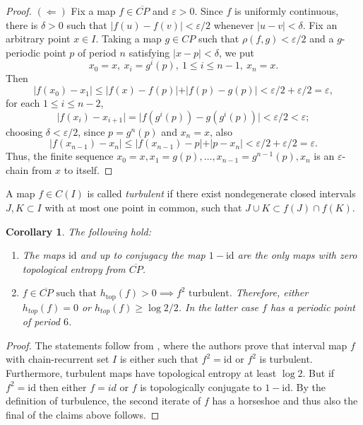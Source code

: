 \documentclass[12pt, a4paper]{amsart}
\newtheorem{corollary}[theorem]{Corollary}
\def\eps{\varepsilon}
\def\le{\leqslant}
\newcommand{\?}{{\bf ???}}
\begin{document}
\begin{proof}
   $(\Leftarrow)$ Fix a map $f\in \overline{CP}$ and $\eps>0$. Since $f$ is uniformly continuous, there is  $\delta>0$ such that $\vert f(u)-f(v)\vert<\eps/2$ whenever $\vert u-v\vert<\delta$. Fix an arbitrary point $x\in I$. Taking a map $g\in CP$ such that $\rho(f,g)<\eps/2$ and a $g$-periodic point $p$ of period $n$ satisfying $\vert x-p\vert<\delta$, we put  
$$x_0=x,~x_i=g^i(p),~ 1\le i\le n-1,~x_n=x.$$ Then 
$$\vert f(x_0)-x_1\vert\le \vert f(x)-f(p)\vert +\vert f(p)-g(p)\vert<\eps/2+\eps/2=\eps,$$
for each $1\le i\le n-2$, 
$$\vert f(x_i)-x_{i+1}\vert=\vert f(g^i(p))-g(g^i(p))\vert<\eps/2<\eps;$$
choosing $\delta<\eps/2$, since $p=g^n(p)$ and $x_n=x$, also 
$$\vert f(x_{n-1})-x_n\vert\le \vert f(x_{n-1})-p\vert +\vert p-x_n\vert<\eps/2+\eps/2=\eps.$$
Thus, the finite sequence $x_0=x,x_1=g(p),\dots,x_{n-1}=g^{n-1}(p),x_n$ is an $\eps$-chain from $x$ to itself.
\end{proof}





A map $f\in C(I)$ is called \textit{turbulent} if there exist nondegenerate closed intervals $J, K \subset I$ with at most one point in common, such that $J\cup K\subset f(J)\cap f(K)$. 

\begin{corollary}\label{cor:turbulence} The following hold:
\begin{enumerate}
\item The maps $\mathrm{id}$ and up to conjugacy the map $1-\mathrm{id}$  are the only maps with zero topological entropy from $\overline{CP}$.
\item
$f\in \overline{CP} \text{ such that } h_{\mathrm{top}}(f)>0 \implies f^2 \text{ turbulent.}$ Therefore, either $h_{top}(f)=0$ or $h_{top}(f)\geq\log{2}/2$. In the latter case $f$ has a periodic point of period $6$.
\end{enumerate}
\end{corollary}

\begin{proof}
 The statements follow from \cite{BC}, where the authors prove that interval map $f$ with chain-recurrent set $I$ is either such that $f^2=\mathrm{id}$  or $f^2$ is turbulent. Furthermore,  turbulent maps have  topological entropy at least   $\log 2$. But if $f^2=\mathrm{id}$ then either $f=id$ or   $f$ is topologically conjugate to $1-\mathrm{id}$. By the definition of turbulence, the second iterate of $f$ has a horseshoe and thus also the final of the claims above follows.
\end{proof}
\end{document}

